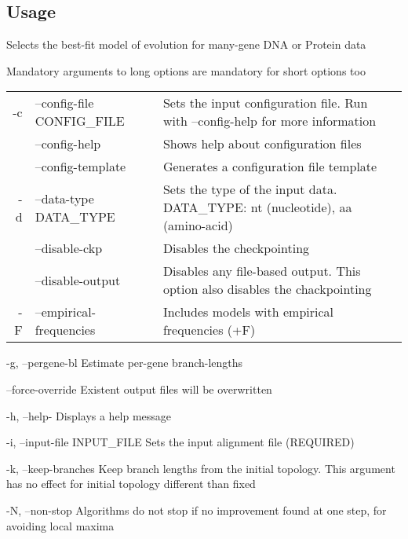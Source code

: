\documentclass[11pt,twoside,a4paper]{article}
\begin{document}
\subsection{Usage}

       Selects the best-fit model of evolution for many-gene DNA or Protein data

       Mandatory arguments to long options are mandatory for short options too

\begin{tabular}{rlp{}}
       -c& --config-file CONFIG\_FILE &
             Sets the input configuration file. Run with --config-help for more information \\

        &--config-help 
        &      Shows help about configuration files \\

        & --config-template 
        &      Generates a configuration file template \\

       -d& --data-type DATA\_TYPE 
         &     Sets the type of the input data. DATA\_TYPE: nt (nucleotide), aa (amino-acid) \\

         &--disable-ckp 
         &     Disables the checkpointing \\

         &--disable-output 
         &     Disables any file-based output. This option also disables the chackpointing\\

       -F & --empirical-frequencies
          &    Includes models with empirical frequencies (+F) \\
\end{tabular}

       -g, --pergene-bl
              Estimate per-gene branch-lengths

       --force-override
              Existent output files will be overwritten

       -h, --help-
              Displays a help message

       -i, --input-file INPUT\_FILE
              Sets the input alignment file (REQUIRED)

       -k, --keep-branches
              Keep branch lengths from the initial topology. This argument has no effect for initial topology different than fixed

       -N, --non-stop
              Algorithms do not stop if no improvement found at one step, for avoiding local maxima
\end{document}

